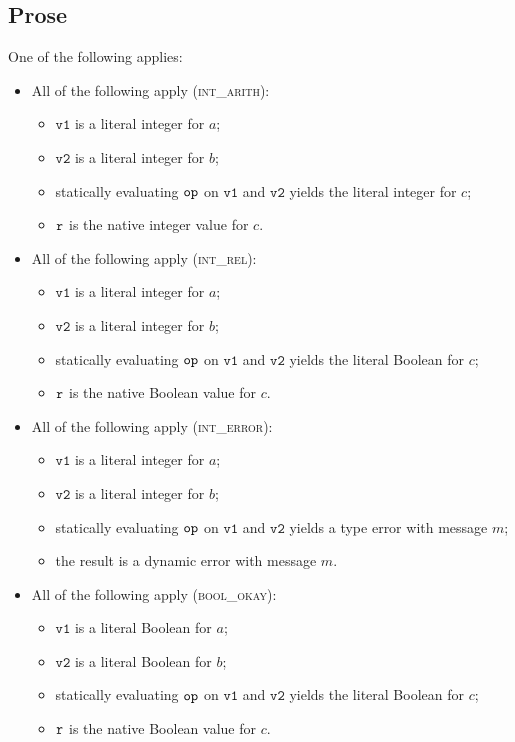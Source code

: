 \documentclass{book}
\newcommand\vvone[0]{\texttt{v1}}
\newcommand\vvtwo[0]{\texttt{v2}}
\begin{document}
\subsection{Prose}
One of the following applies:
\begin{itemize}
  \item All of the following apply (\textsc{int\_arith}):
  \begin{itemize}
    \item $\vvone$ is a literal integer for $a$;
    \item $\vvtwo$ is a literal integer for $b$;
    \item statically evaluating $\texttt{op}$ on $\vvone$ and $\vvtwo$ yields the literal integer for $c$;
    \item $\texttt{r}$ is the native integer value for $c$.
  \end{itemize}

  \item All of the following apply (\textsc{int\_rel}):
  \begin{itemize}
    \item $\vvone$ is a literal integer for $a$;
    \item $\vvtwo$ is a literal integer for $b$;
    \item statically evaluating $\texttt{op}$ on $\vvone$ and $\vvtwo$ yields the literal Boolean for $c$;
    \item $\texttt{r}$ is the native Boolean value for $c$.
  \end{itemize}

  \item All of the following apply (\textsc{int\_error}):
  \begin{itemize}
    \item $\vvone$ is a literal integer for $a$;
    \item $\vvtwo$ is a literal integer for $b$;
    \item statically evaluating $\texttt{op}$ on $\vvone$ and $\vvtwo$ yields a type error with message $m$;
    \item the result is a dynamic error with message $m$.
  \end{itemize}

  \item All of the following apply (\textsc{bool\_okay}):
  \begin{itemize}
    \item $\vvone$ is a literal Boolean for $a$;
    \item $\vvtwo$ is a literal Boolean for $b$;
    \item statically evaluating $\texttt{op}$ on $\vvone$ and $\vvtwo$ yields the literal Boolean for $c$;
    \item $\texttt{r}$ is the native Boolean value for $c$.
  \end{itemize}


\end{itemize}
\end{document}
